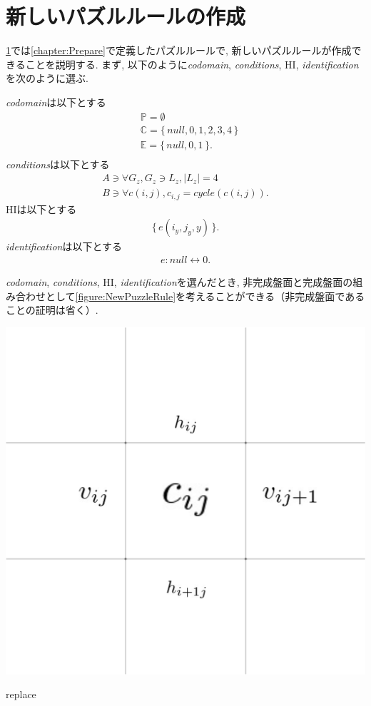 \section{新しいパズルルールの作成}\label{section:NewPuzzleRule}
\cref{section:NewPuzzleRule}では\cref{chapter:Prepare}で定義したパズルルールで, 新しいパズルルールが作成できることを説明する. まず, 以下のように\textit{codomain}, \textit{conditions}, HI, \textit{identification}を次のように選ぶ.

\textit{codomain}は以下とする
\begin{align}
   & \mathbb{P}=\emptyset                       \\
   & \mathbb{C}=\{\,\textit{null},0,1,2,3,4\,\} \\
   & \mathbb{E}=\{\,\textit{null},0,1\,\}  .    \\
\end{align}
\textit{conditions}は以下とする
\begin{align}
  A\ni \forall G_z, G_z\ni L_z, |L_z|=4 \\
  B\ni \forall c(i,j), c_{i,j}= cycle(c(i,j)).
\end{align}
HIは以下とする
\begin{align}
  \{\,e(i_y,j_y,y)\,\}.
\end{align}
\textit{identification}は以下とする
\begin{align}
  e:\textit{null}\leftrightarrow 0.
\end{align}

\textit{codomain}, \textit{conditions}, HI, \textit{identification}を選んだとき, 非完成盤面と完成盤面の組み合わせとして\cref{figure:NewPuzzleRule}を考えることができる（非完成盤面であることの証明は省く）.

\begin{clearpagefigure}
  \includegraphics[width=0.85\linewidth,clip]{fig/cycle.png}
  \caption{replace}
  \label{figure:NumberLink}
\end{clearpagefigure}

